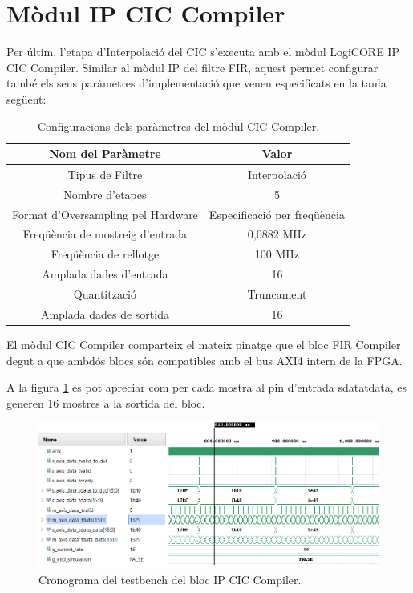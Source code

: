 \section{Mòdul IP CIC Compiler}
\par Per últim, l'etapa d'Interpolació del CIC s'executa amb el mòdul LogiCORE IP CIC Compiler. Similar al mòdul IP del filtre FIR, aquest permet configurar també els seus paràmetres d'implementació que venen especificats en la taula següent:
\begin{table}[H]
    \centering
    \begin{tabular}{ | c | c | }
    \hline
    \centering
    \textbf{Nom del Paràmetre}     &  \textbf{Valor}\\ [2ex] \hline
    \centering
    Tipus de Filtre    &    Interpolació \\ \hline
    \centering
    Nombre d'etapes    &    5 \\ \hline
    \centering
    Format d'Oversampling pel Hardware &    Especificació per freqüència \\ \hline
    \centering
    Freqüència de mostreig d'entrada & 0,0882 MHz \\ \hline
    \centering
    Freqüència de rellotge &    100 MHz \\ \hline
    \centering
    Amplada dades d'entrada &   16 \\ \hline
    \centering
    Quantització & Truncament \\ \hline
    \centering
    Amplada dades de sortida &  16\\ \hline
    \end{tabular}
    \caption{Configuracions dels paràmetres del mòdul CIC Compiler.}
    \label{taula_configCIC}
\end{table}
\par El mòdul CIC Compiler comparteix el mateix pinatge que el bloc FIR Compiler degut a que ambdós blocs són compatibles amb el bus AXI4 intern de la FPGA. 
\par A la figura \ref{figCICtestbench} es pot apreciar com per cada mostra al pin d'entrada s\textunderscore data\textunderscore t\textunderscore data, es generen 16 mostres a la sortida del bloc.

\begin{figure}[H]
    \centering
    \includegraphics[width=0.6\linewidth]{Images/CICtestbench.png}
    \caption{Cronograma del testbench del bloc IP CIC Compiler.}
    \label{figCICtestbench}
\end{figure}

